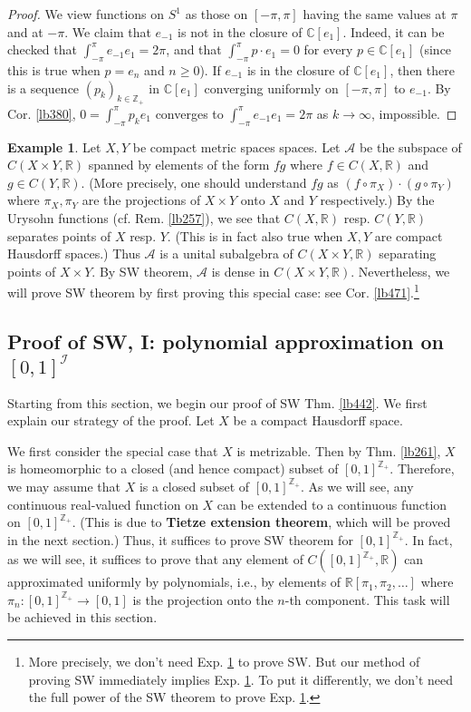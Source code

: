 \documentclass[12pt,b5paper,notitlepage]{article}
\theoremstyle{definition}
\newtheorem{eg}[df]{Example}
\theoremstyle{plain}
\newcommand{\scr}{\mathscr}
\newcommand{\Cbb}{\mathbb C}
\newcommand{\Zbb}{\mathbb Z}
\newcommand{\Rbb}{\mathbb R}
\numberwithin{equation}{section}
\begin{document}
\begin{proof}
We view functions on $S^1$ as those on $[-\pi,\pi]$ having the same values at $\pi$ and at $-\pi$. We claim that $e_{-1}$ is not in the closure of $\Cbb[e_1]$. Indeed, it can be checked that $\int_{-\pi}^{\pi}e_{-1}e_1=2\pi$, and that $\int_{-\pi}^{\pi} p\cdot e_1=0$ for every $p\in\Cbb[e_1]$ (since this is true when $p=e_n$ and $n\geq0$). If $e_{-1}$ is in the closure of $\Cbb[e_1]$, then there is a sequence $(p_k)_{k\in\Zbb_+}$ in $\Cbb[e_1]$ converging uniformly on $[-\pi,\pi]$ to $e_{-1}$. By Cor. \ref{lb380}, $0=\int_{-\pi}^\pi p_ke_1$ converges  to $\int_{-\pi}^\pi e_{-1}e_1=2\pi$ as $k\rightarrow\infty$, impossible.  
\end{proof}

\begin{eg}\label{lb539}
Let $X,Y$ be compact metric spaces spaces. Let $\scr A$ be the subspace of $C(X\times Y,\Rbb)$ spanned by elements of the form $fg$ where $f\in C(X,\Rbb)$ and $g\in C(Y,\Rbb)$. (More precisely, one should understand $fg$ as $(f\circ\pi_X)\cdot(g\circ\pi_Y)$ where $\pi_X,\pi_Y$ are the projections of $X\times Y$ onto $X$ and $Y$ respectively.) By the Urysohn functions (cf. Rem. \ref{lb257}), we see that $C(X,\Rbb)$ resp. $C(Y,\Rbb)$ separates points of $X$ resp. $Y$. (This is in fact also true when $X,Y$ are compact Hausdorff spaces.) Thus $\scr A$ is a unital subalgebra of $C(X\times Y,\Rbb)$ separating points of $X\times Y$. By SW theorem, $\scr A$ is dense in $C(X\times Y,\Rbb)$. Nevertheless, we will prove SW theorem by first proving this special case: see Cor. \ref{lb471}.\footnote{More precisely, we don't need Exp. \ref{lb539} to prove SW. But our method of proving SW immediately implies Exp. \ref{lb539}. To put it differently, we don't need the full power of the SW theorem to prove Exp. \ref{lb539}.}
\end{eg}




\subsection{Proof of SW, I: polynomial approximation on $[0,1]^{\scr I}$}



Starting from this section, we begin our proof of SW Thm. \ref{lb442}. We first explain our strategy of the proof. Let $X$ be a compact Hausdorff space. 

We first consider the special case that $X$ is metrizable. Then by Thm. \ref{lb261}, $X$ is homeomorphic to a closed (and hence compact) subset of $[0,1]^{\Zbb_+}$. Therefore, we may assume that $X$ is a closed subset of $[0,1]^{\Zbb_+}$. As we will see, any continuous real-valued function on $X$ can be extended to a continuous function on  $[0,1]^{\Zbb_+}$. (This is due to \textbf{Tietze extension theorem}, which will be proved in the next section.) Thus, it suffices to prove SW theorem for $[0,1]^{\Zbb_+}$. In fact, as we will see, it suffices to prove that any element of $C([0,1]^{\Zbb_+},\Rbb)$ can approximated uniformly by polynomials, i.e., by elements of $\Rbb[\pi_1,\pi_2,\dots]$ where $\pi_n:[0,1]^{\Zbb_+}\rightarrow[0,1]$ is the projection onto the $n$-th component. This task will be achieved in this section.
\end{document}
